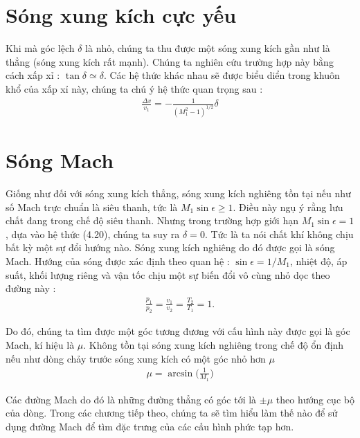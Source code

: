\documentclass[DONG_CHAY_NEN_DUOC.tex]{subfiles}
\begin{document}
\section{Sóng xung kích cực yếu}
Khi mà góc lệch $\delta$ là nhỏ, chúng ta thu được một sóng xung kích gần như là thẳng (sóng xung kích rất mạnh). Chúng ta nghiên cứu trường hợp này bằng cách xấp xỉ : $\tan \delta \simeq \delta$. Các hệ thức khác nhau sẽ được biểu diển trong khuôn khổ của xấp xỉ này, chúng ta chú ý hệ thức quan trọng sau :
\begin{equation}
	\begin{aligned}
		\boxed{
			\frac{{\Delta v}}{{{v_1}}} =  - \frac{1}{{{{\left( {M_1^2 - 1} \right)}^{1/2}}}}\delta
		}
	\end{aligned}
\end{equation}
\section{Sóng Mach}
Giống như đối với sóng xung kích thẳng, sóng xung kích nghiêng tồn tại nếu như số Mach trực chuẩn là siêu thanh, tức là $M_1\sin\epsilon \ge 1$. Điều này ngụ ý rằng lưu chất đang trong chế độ siêu thanh. Nhưng trong trường hợp giới hạn $M_1\sin\epsilon = 1$, dựa vào hệ thức (4.20), chúng ta suy ra $\delta = 0$. Tức là ta nói chất khí không chịu bất kỳ một sự đổi hướng nào. Sóng xung kích nghiêng do đó được gọi là sóng Mach. Hướng của sóng được xác định theo quan hệ : $\sin \epsilon = 1/M_1$, nhiệt độ, áp suất, khối lượng riêng và vận tốc chịu một sự biến đổi vô cùng nhỏ dọc theo đường này :
\begin{equation}
	\begin{aligned}
		\frac{p_1}{p_2}=\frac{v_1}{v_2}=\frac{T_2}{T_1} = 1.
	\end{aligned}
\end{equation}

Do đó, chúng ta tìm được một góc tương đương với cấu hình này được gọi là góc Mach, kí hiệu là $\mu$. Không tồn tại sóng xung kích nghiêng trong chế độ ổn định nếu như dòng chảy trước sóng xung kích có một góc nhỏ hơn $\mu$
\begin{equation}
	\begin{aligned}
		\boxed{
			\mu = \arcsin\Bigg(\frac{1}{M_1}\Bigg)
		}
	\end{aligned}
\end{equation}

Các đường Mach do đó là những đường thẳng có góc tới là $\pm \mu$ theo hướng cục bộ của dòng. Trong các chương tiếp theo, chúng ta sẽ tìm hiểu làm thế nào để sử dụng đường Mach để tìm đặc trưng của các cấu hình phức tạp hơn.
\end{document}
